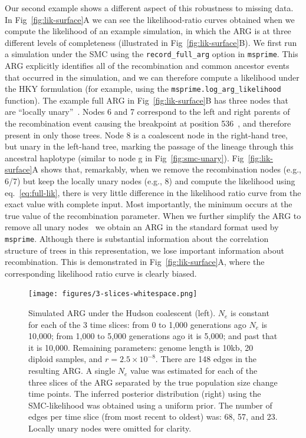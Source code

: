 \documentclass{article}
\begin{document}
Our second example shows a different aspect of this robustness to missing 
data. In Fig~\ref{fig:lik-surface}A we can see the likelihood-ratio curves
obtained when we compute the likelihood of an example simulation,
in which the ARG is at three different levels of completeness
(illustrated in Fig~\ref{fig:lik-surface}B).
We first run a simulation under the SMC
using the \texttt{record\_full\_arg} option in \texttt{msprime}. This 
ARG explicitly identifies all of the recombination and common 
ancestor events that occurred in the simulation, and 
we can therefore compute a likelihood under the HKY formulation
(for example, using the \texttt{msprime.log\_arg\_likelihood} 
function). The example full ARG in 
Fig~\ref{fig:lik-surface}B has three nodes that are ``locally
unary''~\citep{wong_general_2023,fritze2024forest}. Nodes 6 and 7 correspond to the 
left and right parents of the recombination event causing the 
breakpoint at position 536~\cite[we need two nodes to uniquely identify
 the passage of ancestral material through recombination 
events; see][]{baumdicker_efficient_2021}, and therefore present
in only those trees. 
Node 8 is a coalescent node in the right-hand tree, but unary
in the left-hand tree, marking the passage of the lineage through
this ancestral haplotype (similar to node g in Fig~\ref{fig:smc-unary}).
Fig~\ref{fig:lik-surface}A shows that, remarkably, when we 
remove the recombination nodes (e.g., 6/7) but keep the locally unary nodes (e.g., 8)
and compute the likelihood using eq.~\eqref{eq:full-lik},
there is very little difference in the likelihood ratio
curve from the exact value with complete input. 
Most importantly, the minimum occurs at the true value of the 
recombination parameter.
When we further simplify
the ARG to remove all unary nodes~\citep{wong_general_2023,kelleher_efficient_2018} 
we obtain an ARG in the standard format used by \texttt{msprime}.
Although there is substantial information about the correlation
structure of trees in this representation, we lose important
information about recombination. This is demonstrated in 
Fig~\ref{fig:lik-surface}A, where the corresponding likelihood ratio curve
is clearly biased. 


\begin{figure}
    \centering
    \texttt{[image: figures/3-slices-whitespace.png]}
    \caption{Simulated ARG under the Hudson coalescent (left). $N_e$ is constant
    for each of the 3 time slices:
    from 0 to 1,000 generations ago $N_e$ is 10,000;
    from 1,000 to 5,000 generations ago it is 5,000;
    and past that it is 10,000.
    Remaining parameters: genome length is 10kb, 20 diploid samples, and
    $r=2.5\times10^{-8}$. 
    There are 148 edges in the resulting ARG.
    A single $N_e$ value was estimated for each
    of the three slices of the ARG separated by
    the true population size change time points.
    The inferred posterior distribution (right) using the SMC-likelihood was
    obtained using a uniform prior. The number of edges per time slice
    (from most recent to oldest) was: 68, 57, and 23. Locally unary nodes were
    omitted for clarity.}
    \label{fig:3-arg-slices}
\end{figure}
\end{document}
